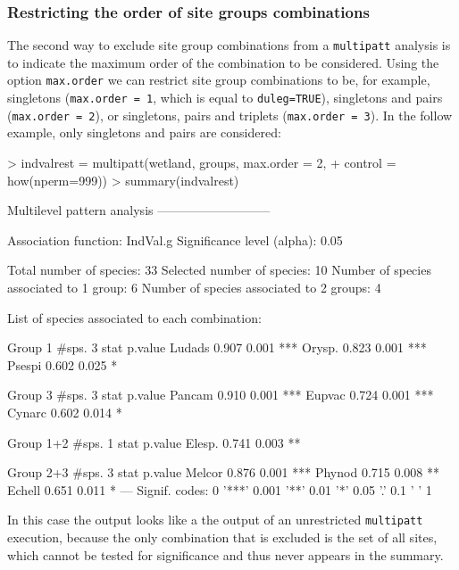 \documentclass[11pt,a4paper]{article}
\begin{document}
\subsubsection{Restricting the order of site groups combinations}
The second way to exclude site group combinations from a \texttt{multipatt} analysis is to indicate the maximum order of the combination to be considered. Using the option \texttt{max.order} we can restrict site group combinations to be, for example, singletons (\texttt{max.order = 1}, which is equal to \texttt{duleg=TRUE}), singletons and pairs (\texttt{max.order = 2}), or singletons, pairs and triplets (\texttt{max.order = 3}). In the follow example, only singletons and pairs are considered: 
\begin{Schunk}
\begin{Sinput}
> indvalrest = multipatt(wetland, groups, max.order = 2, 
+                        control = how(nperm=999)) 
> summary(indvalrest)
\end{Sinput}
\begin{Soutput}
 Multilevel pattern analysis
 ---------------------------

 Association function: IndVal.g
 Significance level (alpha): 0.05

 Total number of species: 33
 Selected number of species: 10 
 Number of species associated to 1 group: 6 
 Number of species associated to 2 groups: 4 

 List of species associated to each combination: 

 Group 1  #sps.  3 
        stat p.value    
Ludads 0.907   0.001 ***
Orysp. 0.823   0.001 ***
Psespi 0.602   0.025 *  

 Group 3  #sps.  3 
        stat p.value    
Pancam 0.910   0.001 ***
Eupvac 0.724   0.001 ***
Cynarc 0.602   0.014 *  

 Group 1+2  #sps.  1 
        stat p.value   
Elesp. 0.741   0.003 **

 Group 2+3  #sps.  3 
        stat p.value    
Melcor 0.876   0.001 ***
Phynod 0.715   0.008 ** 
Echell 0.651   0.011 *  
---
Signif. codes:  0 '***' 0.001 '**' 0.01 '*' 0.05 '.' 0.1 ' ' 1 
\end{Soutput}
\end{Schunk}
In this case the output looks like a the output of an unrestricted \texttt{multipatt} execution, because the only combination that is excluded is the set of all sites, which cannot be tested for significance and thus never appears in the summary. 
\end{document}
